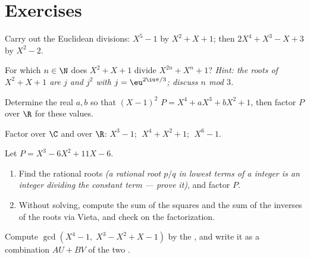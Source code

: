 \section{Exercises}

\begin{exercise}[$\star$]\label{exo:b1:poly:1}
Carry out the Euclidean divisions: $X^5 - 1$ by $X^2 + X + 1$; then
$2X^4 + X^3 - X + 3$ by $X^2 - 2$.
\end{exercise}

\begin{exercise}[$\star$]\label{exo:b1:poly:2}
For which $n \in \N$ does $X^2 + X + 1$ divide $X^{2n} + X^n + 1$?
\emph{Hint: the roots of $X^2 + X + 1$ are $j$ and $j^2$ with $j =
\eu^{2\iu\pi/3}$; discuss $n$ mod $3$.}
\end{exercise}

\begin{exercise}[$\star$]\label{exo:b1:poly:3}
Determine the real $a, b$ so that $(X-1)^2$  $P = X^4 + aX^3 +
bX^2 + 1$, then factor $P$ over $\R$ for these values.
\end{exercise}

\begin{exercise}[$\star$]\label{exo:b1:poly:4}
Factor over $\C$ and over $\R$: $X^3 - 1$; $\;X^4 + X^2 + 1$;
$\;X^6 - 1$.
\end{exercise}

\begin{exercise}[$\star\star$]\label{exo:b1:poly:5}
Let $P = X^3 - 6X^2 + 11X - 6$.
\begin{enumerate}
  \item Find the rational roots \emph{(a rational root $p/q$ in
        lowest terms of a  integer  is an integer
        dividing the constant term --- prove it)}, and factor $P$.
  \item Without solving, compute the sum of the squares and the sum
        of the inverses of the roots via Vieta, and check on the
        factorization.
\end{enumerate}
\end{exercise}

\begin{exercise}[$\star\star$]\label{exo:b1:poly:6}
Compute $\gcd(X^4 - 1,\; X^3 - X^2 + X - 1)$ by the , and write it as a combination $AU + BV$ of the two
.
\end{exercise}

